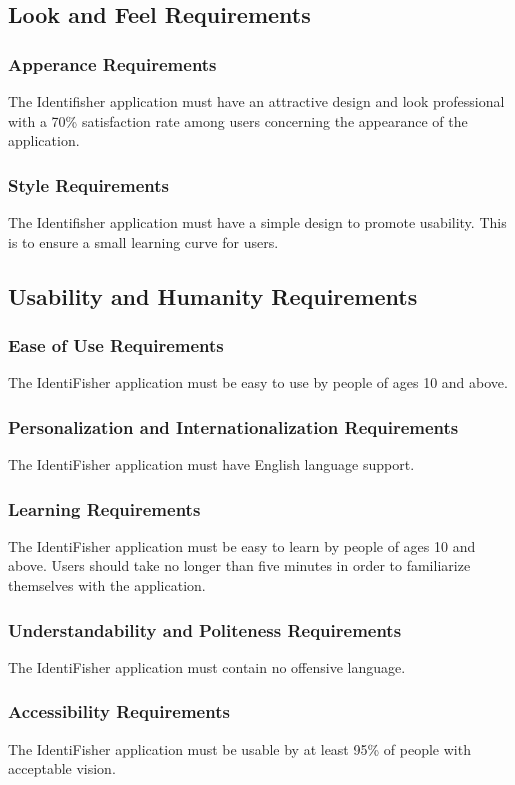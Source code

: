 \documentclass{article}
\begin{document}
\subsection{Look and Feel Requirements}
\subsubsection{Apperance Requirements}
The Identifisher application must have an attractive design and look professional with a 70\% satisfaction rate among users concerning the appearance of the application.
\subsubsection{Style Requirements}
The Identifisher application must have a simple design to promote usability. This is to ensure a small learning curve for users.

\subsection{Usability and Humanity Requirements}
\subsubsection{Ease of Use Requirements}
The IdentiFisher application must be easy to use by people of ages 10 and above.
\subsubsection{Personalization and Internationalization Requirements}
The IdentiFisher application must have English language support.
\subsubsection{Learning Requirements}
The IdentiFisher application must be easy to learn by people of ages 10 and above. Users should take no longer than five minutes in order to familiarize themselves with the application.
\subsubsection{Understandability and Politeness Requirements}
The IdentiFisher application must contain no offensive language.
\subsubsection{Accessibility Requirements}
The IdentiFisher application must be usable by at least 95\% of people with acceptable vision.
\end{document}
